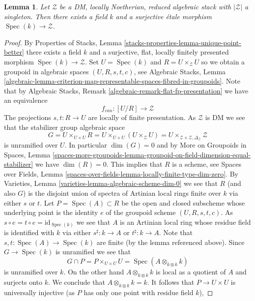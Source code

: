 \documentclass{stacks-project}
\theoremstyle{plain}
\newtheorem{lemma}[subsection]{Lemma}
\theoremstyle{definition}
\theoremstyle{remark}
\numberwithin{equation}{subsection}
\def\Spec{\mathop{\mathrm{Spec}}}
\begin{document}
\begin{lemma}
\label{lemma-DM-residual-gerbe}
Let $\mathcal{Z}$ be a DM, locally Noetherian, reduced algebraic stack
with $|\mathcal{Z}|$ a singleton. Then there exists a field $k$ and
a surjective \'etale morphism $\Spec(k) \to \mathcal{Z}$.
\end{lemma}

\begin{proof}
By
Properties of Stacks, Lemma \ref{stacks-properties-lemma-unique-point-better}
there exists a field $k$ and a surjective, flat, locally finitely presented
morphism $\Spec(k) \to \mathcal{Z}$. Set $U = \Spec(k)$ and
$R = U \times_\mathcal{Z} U$ so we obtain a groupoid in algebraic spaces
$(U, R, s, t, c)$, see
Algebraic Stacks, Lemma
\ref{algebraic-lemma-criterion-map-representable-spaces-fibred-in-groupoids}.
Note that by
Algebraic Stacks, Remark \ref{algebraic-remark-flat-fp-presentation}
we have an equivalence
$$
f_{can} : [U/R] \longrightarrow \mathcal{Z}
$$
The projections $s, t : R \to U$ are locally of finite presentation.
As $\mathcal{Z}$ is DM we see that the stabilizer group algebraic space
$$
G = U \times_{U \times U} R = U \times_{U \times U} (U \times_\mathcal{Z} U) =
U \times_{\mathcal{Z} \times \mathcal{Z}, \Delta_\mathcal{Z}} \mathcal{Z}
$$
is unramified over $U$. In particular $\dim(G) = 0$ and by
More on Groupoids in Spaces, Lemma
\ref{spaces-more-groupoids-lemma-groupoid-on-field-dimension-equal-stabilizer}
we have $\dim(R) = 0$. This implies that $R$ is a scheme, see
Spaces over Fields, Lemma
\ref{spaces-over-fields-lemma-locally-finite-type-dim-zero}.
By
Varieties, Lemma \ref{varieties-lemma-algebraic-scheme-dim-0}
we see that $R$ (and also $G$) is the disjoint union of spectra of
Artinian local rings finite over $k$ via either $s$ or $t$. Let
$P = \Spec(A) \subset R$ be the open and
closed subscheme whose underlying point is the identity $e$ of the groupoid
scheme $(U, R, s, t, c)$. As
$s \circ e = t \circ e = \text{id}_{\Spec(k)}$ we see that $A$
is an Artinian local ring whose residue field is identified with $k$
via either $s^\sharp : k \to A$ or $t^\sharp : k \to A$.
Note that $s, t : \Spec(A) \to \Spec(k)$
are finite (by the lemma referenced above). Since
$G \to \Spec(k)$ is unramified we see that
$$
G \cap P = P \times_{U \times U} U = \Spec(A \otimes_{k \otimes k} k)
$$
is unramified over $k$. On the other hand $A \otimes_{k \otimes k} k$
is local as a quotient of $A$ and surjects onto $k$. We conclude that
$A \otimes_{k \otimes k} k = k$. It follows that $P \to U \times U$
is universally injective (as $P$ has only one point with residue field $k$),

\end{proof}
\end{document}
